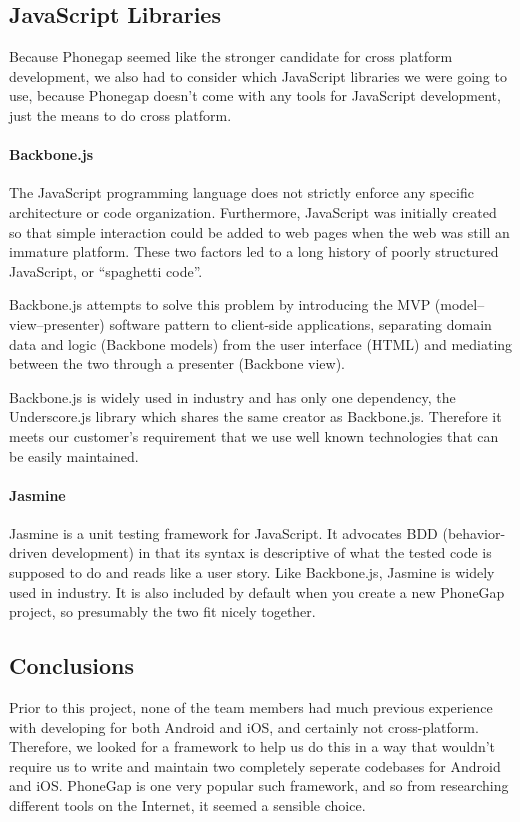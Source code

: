 \subsection{JavaScript Libraries}

Because Phonegap seemed like the stronger candidate for cross platform development, 
we also had to consider which JavaScript libraries we were going to use, because
Phonegap doesn't come with any tools for JavaScript development, just the means 
to do cross platform.

\paragraph{Backbone.js}
The JavaScript programming language does not strictly enforce any specific
architecture or code organization. Furthermore, JavaScript was initially
created so that simple interaction could be added to web pages when the web was
still an immature platform. These two factors led to a long history of poorly
structured JavaScript, or ``spaghetti code''.

Backbone.js attempts to solve this problem by introducing the MVP
(model--view--presenter) software pattern to client-side applications,
separating domain data and logic (Backbone models) from the user interface
(HTML) and mediating between the two through a presenter (Backbone view).

Backbone.js is widely used in industry and has only one dependency, the
Underscore.js library which shares the same creator as Backbone.js.
Therefore it meets our customer's requirement that we use well known
technologies that can be easily maintained. \cite{backbone}

\paragraph{Jasmine}
Jasmine is a unit testing framework for JavaScript. It advocates BDD
(behavior-driven development) in that its syntax is descriptive of what the
tested code is supposed to do and reads like a user story. Like Backbone.js,
Jasmine is widely used in industry. It is also included by default when you
create a new PhoneGap project, so presumably the two fit nicely together.
\cite{jasmine}

\subsection{Conclusions}
Prior to this project, none of the team members had much previous experience
with developing for both Android and iOS, and certainly not cross-platform.
Therefore, we looked for a framework to help us do this in a way that wouldn't
require us to write and maintain two completely seperate codebases for Android
and iOS. PhoneGap is one very popular such framework, and so from researching
different tools on the Internet, it seemed a sensible choice.

